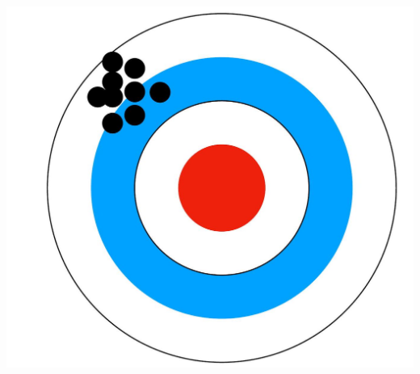 \documentclass[10pt]{article}
\begin{document}
\begin{center}
\includegraphics[max width=\textwidth]{2023_12_30_442f876157646883c2c9g-29}
\end{center}
\end{document}
